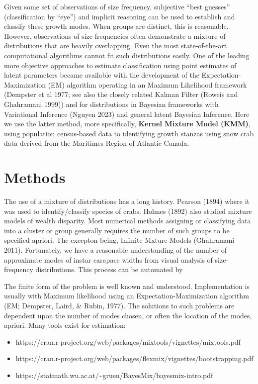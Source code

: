 \documentclass[12pt,letterpaper,]{paper}
\begin{document}
Given some set of observations of size frequency, subjective ``best
guesses'' (classification by ``eye'') and implicit reasoning can be used
to establish and classify these growth modes. When groups are distinct,
this is reasonable. However, observations of size frequencies often
demonstrate a mixture of distributions that are heavily overlapping.
Even the most state-of-the-art computational algorithms cannot fit such
distributions easily. One of the leading more objective approaches to
estimate classification using point estimates of latent parameters
became available with the development of the Expectation-Maximization
(EM) algorithm operating in an Maximum Likelihood framework (Dempster et
al 1977; see also the closely related Kalman Filter (Roweis and
Ghahramani 1999)) and for distributions in Bayesian frameworks with
Variational Inference (Nguyen 2023) and general latent Bayesian
Inference. Here we use the latter method, more specifically,
\textbf{Kernel Mixture Model (KMM)}, using population census-based data
to identifying growth stanzas using snow crab data derived from the
Maritimes Region of Atlantic Canada.

\section{Methods}\label{methods}

The use of a mixture of distributions has a long history. Pearson (1894)
where it was used to identify/classify species of crabs. Holmes (1892)
also studied mixture models of wealth disparity. Most numerical methods
assigning or classifying data into a cluster or group generally requires
the number of such groups to be specified apriori. The excepton being,
Infinite Mxture Models (Ghahramani 2011). Fortunately, we have a
reasonable understanding of the number of approximate modes of instar
carapace widths from visual analysis of size-frequency distributions.
This process can be automated by

The finite form of the problem is well known and understood.
Implementation is usually with Maximum likelihood using an
Expectation-Maximization algorithm (EM; Dempster, Laird, \& Rubin,
1977). The solutions to such problems are dependent upon the number of
modes chosen, or often the location of the modes, apriori. Many tools
exist for estimation:

\begin{itemize}
\item
  https://cran.r-project.org/web/packages/mixtools/vignettes/mixtools.pdf
\item
  https://cran.r-project.org/web/packages/flexmix/vignettes/bootstrapping.pdf
\item
  https://statmath.wu.ac.at/\textasciitilde gruen/BayesMix/bayesmix-intro.pdf
\end{itemize}
\end{document}
